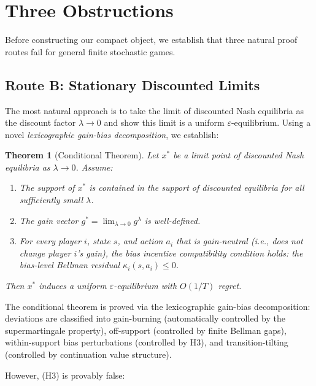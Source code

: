 \documentclass[12pt,a4paper]{article}
\newtheorem{theorem}{Theorem}[section]
\theoremstyle{definition}
\newcommand{\eps}{\varepsilon}
\begin{document}
\section{Three Obstructions}
\label{sec:obstructions}

Before constructing our compact object, we establish that three natural proof routes fail for general finite stochastic games.

\subsection{Route B: Stationary Discounted Limits}
\label{sec:route-b}

The most natural approach is to take the limit of discounted Nash equilibria as the discount factor $\lambda \to 0$ and show this limit is a uniform $\eps$-equilibrium. Using a novel \emph{lexicographic gain-bias decomposition}, we establish:

\begin{theorem}[Conditional Theorem]
\label{thm:conditional}
Let $x^*$ be a limit point of discounted Nash equilibria as $\lambda \to 0$. Assume:
\begin{enumerate}[label=(H\arabic*)]
\item The support of $x^*$ is contained in the support of discounted equilibria for all sufficiently small $\lambda$.
\item The gain vector $g^* = \lim_{\lambda \to 0} g^\lambda$ is well-defined.
\item For every player $i$, state $s$, and action $a_i$ that is gain-neutral (i.e., does not change player $i$'s gain), the \emph{bias incentive compatibility} condition holds: the bias-level Bellman residual $\kappa_i(s, a_i) \leq 0$.
\end{enumerate}
Then $x^*$ induces a uniform $\eps$-equilibrium with $O(1/T)$ regret.
\end{theorem}

The conditional theorem is proved via the lexicographic gain-bias decomposition: deviations are classified into gain-burning (automatically controlled by the supermartingale property), off-support (controlled by finite Bellman gaps), within-support bias perturbations (controlled by H3), and transition-tilting (controlled by continuation value structure).

However, (H3) is provably false:
\end{document}
